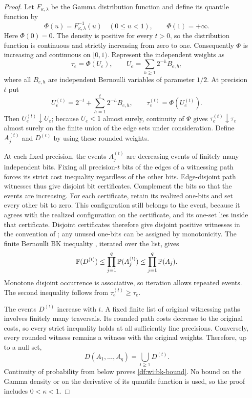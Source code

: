 \begin{proof}
Let $F_{\kappa,\lambda}$ be the Gamma distribution function and define
its quantile function by
\[
 \Phi(u)=F_{\kappa,\lambda}^{-1}(u)\quad(0\le u<1),
 \qquad\Phi(1)=+\infty.
\]
Here $\Phi(0)=0$. The density is positive for every $t>0$, so the
distribution function is continuous and strictly increasing from zero
to one. Consequently $\Phi$ is increasing and continuous on $[0,1)$.
Represent the independent weights as
\[
 \tau_e=\Phi(U_e),\qquad
 U_e=\sum_{h\ge1}2^{-h}B_{e,h},
\]
where all $B_{e,h}$ are independent Bernoulli variables of parameter
$1/2$. At precision $t$ put
\[
 U_e^{(t)}=2^{-t}+\sum_{h=1}^t2^{-h}B_{e,h},
 \qquad \tau_e^{(t)}=\Phi(U_e^{(t)}).
\]
Then $U_e^{(t)}\downarrow U_e$; because $U_e<1$ almost surely,
continuity of $\Phi$ gives $\tau_e^{(t)}\downarrow\tau_e$ almost surely
on the finite union of the edge sets under consideration. Define
$A_j^{(t)}$ and $D^{(t)}$ by using these rounded weights.

At each fixed precision, the events $A_j^{(t)}$ are decreasing events
of finitely many independent bits. Fixing all precision-$t$ bits of
the edges of a witnessing path forces its strict cost inequality
regardless of the other bits. Edge-disjoint path witnesses thus give
disjoint bit certificates. Complement the bits so that the events are
increasing. For each certificate, retain its realized one-bits and set
every other bit to zero. This configuration still belongs to the event,
because it agrees with the realized configuration on the certificate,
and its one-set lies inside that certificate. Disjoint certificates
therefore give disjoint positive witnesses in the convention of
\cite{BK85}; any unused one-bits can be assigned by monotonicity.
The finite Bernoulli BK inequality
\cite[Theorem~3.3, Equation~(3.4)]{BK85}, iterated over the list, gives
\[
 \mathbb P(D^{(t)})\le\prod_{j=1}^q\mathbb P(A_j^{(t)})
                   \le\prod_{j=1}^q\mathbb P(A_j).
\]
Monotone disjoint occurrence is associative, so iteration allows
repeated events. The second inequality follows from
$\tau_e^{(t)}\ge\tau_e$.

The events $D^{(t)}$ increase with $t$. A fixed finite list of
original witnessing paths involves finitely many traversals. Its
rounded path costs decrease to the original costs, so every strict
inequality holds at all sufficiently fine precisions. Conversely,
every rounded witness remains a witness with the original weights.
Therefore, up to a null set,
\[
 D(A_1,\ldots,A_q)=\bigcup_{t\ge1}D^{(t)}.
\]
Continuity of probability from below proves \eqref{df:wi:bk-bound}.
No bound on the Gamma density or on the derivative of its quantile
function is used, so the proof includes $0<\kappa<1$.
\end{proof}

